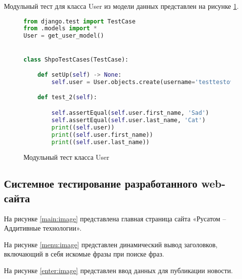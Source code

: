 Модульный тест для класса User из модели данных представлен на рисунке \ref{unitUser:image}.

\begin{figure}[ht]
\begin{lstlisting}[language=Python]
from django.test import TestCase
from .models import *
User = get_user_model()


class ShpoTestCases(TestCase):

    def setUp(self) -> None:
        self.user = User.objects.create(username='testtestovich', password='testtestovich', first_name='Sad', last_name='')

    def test_2(self):

        self.assertEqual(self.user.first_name, 'Sad')
        self.assertEqual(self.user.last_name, 'Cat')
        print((self.user))
        print((self.user.first_name))
        print((self.user.last_name))
\end{lstlisting}  
\caption{Модульный тест класса User}
\label{unitUser:image}
\end{figure}

\subsection{Системное тестирование разработанного web-сайта}

На рисунке \ref{main:image} представлена главная страница сайта «Русатом – Аддитивные технологии».
\newpage %


На рисунке \ref{menu:image} представлен динамический вывод заголовков, включающий в себя искомые фразы при поиске фраз.



На рисунке \ref{enter:image} представлен ввод данных для публикации новости.


